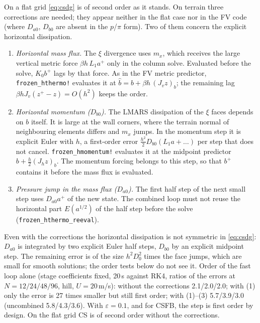 \documentclass[11pt,a4paper]{article}
\newcommand{\code}[1]{\texttt{#1}}
\begin{document}
On a flat grid \eqref{eq:csdg} is of second order as it stands. On terrain three corrections are needed; they appear
neither in the flat case nor in the FV code (where $D_{a0}$, $D_{b0}$ are absent in the $p$/$\pi$ form). Two of them
concern the explicit horizontal dissipation.
\begin{enumerate}
\item \emph{Horizontal mass flux.} The $\xi$ divergence uses $m_x$, which receives the large vertical metric
  force $\beta h\,L_1a^+$ only in the column solve. Evaluated before the solve, $K_0b^+$ lags by that force.
  As in the FV metric predictor, \code{frozen\_hthermo!} evaluates it at $\hat b=b+\beta h\,(J_vz)_b$; the
  remaining lag $\beta hJ_v(z^+-z)=O(h^2)$ keeps the order.
\item \emph{Horizontal momentum ($D_{b0}$).} The LMARS dissipation of the $\xi$ faces depends on $b$ itself. It is
  large at the wall corners, where the terrain normal of neighbouring elements differs and $m_x$ jumps. In the
  momentum step it is explicit Euler with $h$, a first-order error $\tfrac{h^2}2D_{b0}(L_1a+\dots)$ per step that does not cancel.
  \code{frozen\_hmomentum!} evaluates it at the midpoint predictor $b+\tfrac h2(J_hz)_b$. The momentum forcing belongs to this
  step, so that $b^+$ contains it before the mass flux is evaluated.
\item \emph{Pressure jump in the mass flux ($D_{a0}$).} The first half step of the next small step uses $D_{a0}a^+$ of the
  new state. The combined loop must not reuse the horizontal part $E(a^{1/2})$ of the half step before the solve
  (\code{frozen\_hthermo\_reeval}).
\end{enumerate}
Even with the corrections the horizontal dissipation is not symmetric in \eqref{eq:csdg}: $D_{a0}$ is integrated by two
explicit Euler half steps, $D_{b0}$ by an explicit midpoint step. The remaining error is of the size $h^2D_0^2$ times the face
jumps, which are small for smooth solutions; the order tests below do not see it.
Order of the fast loop alone (stage coefficients fixed, 20\,s against RK4, ratios of the errors at
$N=12/24/48/96$, hill, $U=20$\,m/s): without the corrections 2.1/2.0/2.0; with (1) only the error is 27 times
smaller but still first order; with (1)--(3) 5.7/3.9/3.0 (uncombined 5.8/4.3/3.6). With $\varepsilon=0.1$, and for
CSFB, the step is first order by design. On the flat grid CS is of second order without the
corrections.
\end{document}

